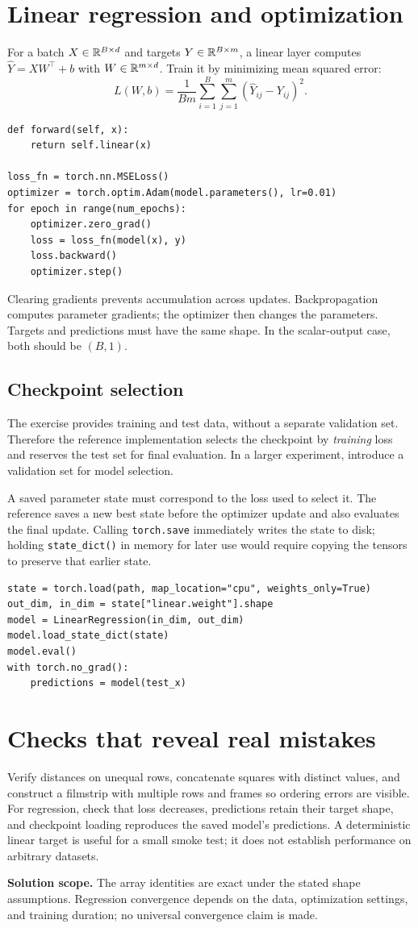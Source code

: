 \newpage
\section{Linear regression and optimization}
For a batch $X\in\mathbb{R}^{B\times d}$ and targets $Y\in\mathbb{R}^{B\times m}$, a linear
layer computes $\widehat Y=XW^\top+b$ with $W\in\mathbb{R}^{m\times d}$. Train it by
minimizing mean squared error:
\[
 L(W,b)=\frac{1}{Bm}\sum_{i=1}^{B}\sum_{j=1}^{m}
 (\widehat Y_{ij}-Y_{ij})^2.
\]
\begin{lstlisting}
def forward(self, x):
    return self.linear(x)

loss_fn = torch.nn.MSELoss()
optimizer = torch.optim.Adam(model.parameters(), lr=0.01)
for epoch in range(num_epochs):
    optimizer.zero_grad()
    loss = loss_fn(model(x), y)
    loss.backward()
    optimizer.step()
\end{lstlisting}
Clearing gradients prevents accumulation across updates. Backpropagation
computes parameter gradients; the optimizer then changes the parameters.
Targets and predictions must have the same shape. In the scalar-output case,
both should be $(B,1)$.

\subsection{Checkpoint selection}
The exercise provides training and test data, without a separate validation
set. Therefore the reference implementation selects the checkpoint by
\emph{training} loss and reserves the test set for final evaluation. In a
larger experiment, introduce a validation set for model selection.

A saved parameter state must correspond to the loss used to select it.
The reference saves a new best state before the optimizer update and also
evaluates the final update. Calling \texttt{torch.save} immediately writes
the state to disk; holding \texttt{state\_dict()} in memory for later use
would require copying the tensors to preserve that earlier state.

\begin{lstlisting}
state = torch.load(path, map_location="cpu", weights_only=True)
out_dim, in_dim = state["linear.weight"].shape
model = LinearRegression(in_dim, out_dim)
model.load_state_dict(state)
model.eval()
with torch.no_grad():
    predictions = model(test_x)
\end{lstlisting}

\section{Checks that reveal real mistakes}
Verify distances on unequal rows, concatenate squares with distinct values,
and construct a filmstrip with multiple rows and frames so ordering errors
are visible. For regression, check that loss decreases, predictions retain
their target shape, and checkpoint loading reproduces the saved model's
predictions. A deterministic linear target is useful for a small smoke test;
it does not establish performance on arbitrary datasets.

\textbf{Solution scope.} The array identities are exact under the stated
shape assumptions. Regression convergence depends on the data, optimization
settings, and training duration; no universal convergence claim is made.

